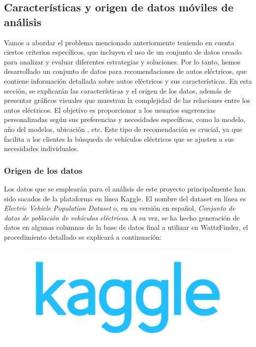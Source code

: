 \documentclass[12pt]{article}
\begin{document}
\subsection{Características y origen de datos móviles de análisis}
Vamos a abordar el  problema mencionado anteriormente teniendo en cuenta ciertos criterios específicos, que incluyen el uso de un conjunto de datos creado para analizar y evaluar diferentes estrategias y soluciones. Por lo tanto, hemos desarrollado un conjunto de datos para recomendaciones de autos eléctricos, que contiene información detallada sobre autos eléctricos y sus características. En esta sección, se explicarán las características y el origen de los datos, además de presentar gráficos visuales que muestran la complejidad de las relaciones entre los autos eléctricos. El objetivo es proporcionar a los usuarios sugerencias personalizadas según sus preferencias y necesidades específicas, como la modelo, año del modelos, ubicación , etc. Este tipo de recomendación es crucial, ya que facilita a los clientes la búsqueda de vehículos eléctricos  que se ajusten a sus necesidades individuales.


\subsubsection{Origen de los datos}
Los datos que se emplearán para el análisis de este proyecto principalmente han sido sacados de la plataforma en línea Kaggle. El nombre del dataset en línea es \textit{Electric Vehicle Population Dataset} o, en su versión en español, \textit{Conjunto de datos de población de vehículos eléctricos}. A su vez, se ha hecho generación de datos en algunas columnas de la base de datos final a utilizar en WattzFinder, el procedimiento detallado se explicará a continuación:


\begin{figure}[htbp]
    \centering
    \includegraphics[width=\textwidth]{./imgs-latex/kaggleLogo-img1.png}\label{fig:kaggleimg1}
\end{figure}
    
\end{document}
